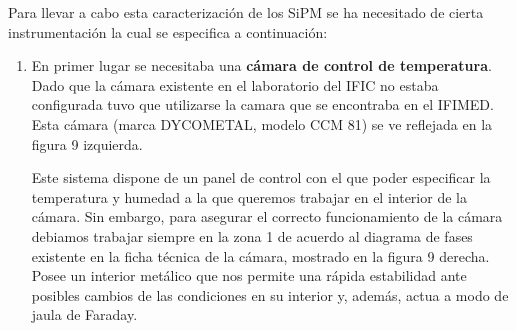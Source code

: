 Para llevar a cabo esta caracterización de los SiPM se ha necesitado de cierta instrumentación la cual se especifica a continuación:

\begin{enumerate}
\item {} En primer lugar se necesitaba una \textbf{cámara de control de temperatura}. 
\newline
Dado que la cámara existente en el laboratorio del IFIC no estaba configurada tuvo que utilizarse la camara que se encontraba en el IFIMED. Esta cámara (marca DYCOMETAL, modelo CCM 81) se ve reflejada en la figura 9 izquierda.

Este sistema dispone de un panel de control con el que poder especificar la temperatura y humedad a la que queremos trabajar en el interior de la cámara. Sin embargo, para asegurar el correcto funcionamiento de la cámara debiamos trabajar siempre en la zona 1 de acuerdo al diagrama de fases existente en la ficha técnica de la cámara, mostrado en la figura 9 derecha. Posee un interior metálico que nos permite una rápida estabilidad ante posibles cambios de las condiciones en su interior y, además, actua a modo de jaula de Faraday. 


\end{enumerate}
